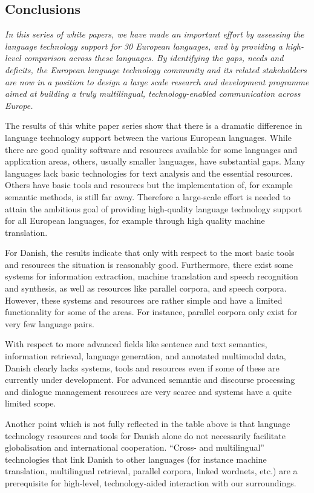 \begin{multicols}{2}
\subsection{Conclusions}

\emph{In this series of white papers, we have made an important effort by assessing the language technology support for 30 European languages, and by providing a high-level comparison across these languages. By identifying the gaps, needs and deficits, the European language technology community and its related stakeholders are now in a position to design a large scale research and development programme aimed at building a truly multilingual, technology-enabled communication across Europe.}

The results of this white paper series show that there is a dramatic difference in language technology support between the various European languages. While there are good quality software and resources available for some languages and application areas, others, usually smaller languages, have substantial gaps. Many languages lack basic technologies for text analysis and the essential resources. Others have basic tools and resources but the implementation of, for example semantic methods, is still far away. Therefore a large-scale effort is needed to attain the ambitious goal of providing high-quality language technology support for all European languages, for example through high quality machine translation. 

For Danish, the results indicate that only with respect to the most basic tools and resources the situation is reasonably good. Furthermore, there exist some systems for information extraction, machine translation and speech recognition and synthesis, as well as resources like parallel corpora, and speech corpora. However, these systems and resources are rather simple and have a limited functionality for some of the areas. For instance, parallel corpora only exist for very few language pairs.

With respect to more advanced fields like sentence and text semantics, information retrieval, language generation, and annotated multimodal data, Danish clearly lacks systems, tools and resources even if some of these are currently under development. For advanced semantic and discourse processing and  dialogue management resources are very scarce and systems have a quite limited scope.

Another point which is not fully reflected in the table above is that language technology resources and tools for Danish alone do not necessarily facilitate globalisation and international cooperation. ``Cross- and multilingual'' technologies that link Danish to other languages (for instance machine translation, multilingual retrieval, parallel corpora, linked wordnets, etc.) are a prerequisite for high-level, technology-aided interaction with our surroundings. 


\end{multicols}
